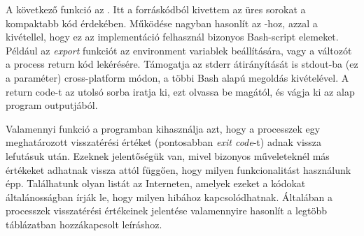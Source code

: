 A következő funkció az \texttt{}. Itt a forráskódból kivettem az üres sorokat a kompaktabb kód érdekében. Működése nagyban hasonlít az \texttt{}-hoz, azzal a kivétellel, hogy ez az implementáció felhasznál bizonyos Bash-script elemeket. Például az \textit{export} funkciót az environment variablek beállítására, vagy a \textit{} változót a process return kód lekérésére. Támogatja az stderr átirányítását is stdout-ba (ez a \texttt{} paraméter) cross-platform módon, a többi Bash alapú megoldás kivételével. A return code-t az utolsó sorba iratja ki, ezt olvassa be magától, és vágja ki az alap program outputjából.

\pagebreak
{}
Valamennyi funkció a programban kihasználja azt, hogy a processzek egy meghatározott visszatérési értéket (pontosabban \textit{exit code}-t) adnak vissza lefutásuk után. Ezeknek jelentőségük van, mivel bizonyos műveleteknél más értékeket adhatnak vissza attól függően, hogy milyen funkcionalitást használunk épp. Találhatunk olyan listát az Interneten, amelyek ezeket a kódokat általánosságban írják le, hogy milyen hibához kapcsolódhatnak. 
Általában a processzek visszatérési értékeinek jelentése valamennyire hasonlít a legtöbb táblázatban hozzákapcsolt leíráshoz. \cite{linux_exitcodes}

